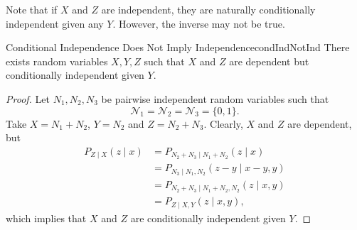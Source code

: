 \documentclass[math, code]{amznotes}
\theoremstyle{remark}
\begin{document}
Note that if $X$ and $Z$ are independent, they are naturally conditionally independent given any $Y$. However, the inverse may not be true.
\begin{probox}{Conditional Independence Does Not Imply Independence}{condIndNotInd}
    There exists random variables $X, Y, Z$ such that $X$ and $Z$ are dependent but conditionally independent given $Y$.
    \tcblower
    \begin{proof}
        Let $N_1, N_2, N_3$ be pairwise independent random variables such that 
        \begin{equation*}
            \mathcal{N}_1 = \mathcal{N}_2 = \mathcal{N}_3 = \{0, 1\}.
        \end{equation*}
        Take $X = N_1 + N_2$, $Y = N_2$ and $Z = N_2 + N_3$. Clearly, $X$ and $Z$ are dependent, but 
        \begin{align*}
            P_{Z \mid X}\left(z \mid x\right) & = P_{N_2 + N_3 \mid N_1 + N_2}\left(z \mid x\right) \\
            & = P_{N_3 \mid N_1, N_2}\left(z - y \mid x - y, y\right) \\
            & = P_{N_2 + N_3 \mid N_1 + N_2, N_2}\left(z \mid x, y\right) \\
            & = P_{Z \mid X, Y}\left(z \mid x, y\right),
        \end{align*}
        which implies that $X$ and $Z$ are conditionally independent given $Y$.
    \end{proof}
\end{probox}
\end{document}
